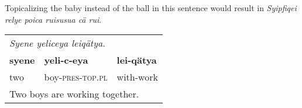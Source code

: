 \documentclass{article}
\begin{document}
Topicalizing the baby instead of the ball in this sentence would result in \emph{Syipfiqei relye poica ruisusua c\"a rui}.
\\[0.5cm]
\begin{tabular}{l l l}
\multicolumn{3}{l}{\emph{Syene yeliceya leiq\"atya.}} \\
\textbf{syene} & \textbf{yeli-c-eya} & \textbf{lei-q\"atya} \\
two & boy-\textsc{pres-top.pl} & with-work \\
\multicolumn{3}{l}{Two boys are working together.} \\
\end{tabular}
\end{document}
